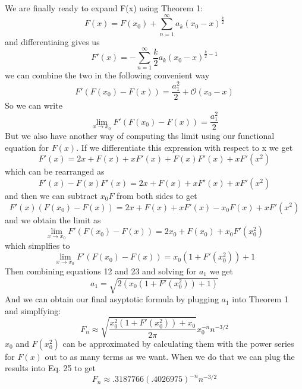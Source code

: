 \documentclass{article}
\begin{document}
We are finally ready to expand F(x) using Theorem 1:
\begin{equation}
F(x)=F(x_0)+\sum_{n=1}^\infty a_k(x_0-x)^{\frac{k}{2}}
\end{equation}
and differentiaing gives us
\begin{equation}
F'(x)=-\sum_{n=1}^\infty \frac{k}{2} a_k(x_0-x)^{\frac{k}{2}-1}
\end{equation}
we can combine the two in the following convenient way
\begin{equation}
F'(F(x_0)-F(x))=\frac{a_1^2}{2} + \mathscr{O}(x_0-x)
\end{equation}
So we can write
\[\lim_{x\to x_0}F'(F(x_0)-F(x))=\frac{a_1^2}{2}\]
 But we also have another way of computing ths limit using our functional equation for \(F(x)\). If we differentiate this expression with respect to x we get
\begin{equation}
F'(x)=2x+F(x)+xF'(x)+F(x)F'(x)+xF'(x^2)
\end{equation}
which can be rearranged as
\begin{equation}
F'(x)-F(x)F'(x)=2x+F(x)+xF'(x)+xF'(x^2)
\end{equation}
and then we can subtract \(x_0F\) from both sides to get
\[F'(x)(F(x_0)-F(x))=2x+F(x)+xF'(x)-x_0F(x)+xF'(x^2)\]
and we obtain the limit as
\[\lim_{x\to x_0}F'(F(x_0)-F(x))=2x_0+F(x_0)+x_0F'(x_0^2)\]
which simplfies to
\begin{equation}
\lim_{x\to x_0}F'(F(x_0)-F(x))=x_0(1+F'(x_0^2))+1
\end{equation}
Then combining equations 12 and 23 and solving for \(a_1\) we get
\begin{equation}
a_1=\sqrt{2(x_0(1+F'(x_0^2))+1)}
\end{equation}
And we can obtain our final asyptotic formula by plugging \(a_1\) into Theorem 1 and simplfying:
\begin{equation}
F_n \approx \sqrt{\frac{x_0^2(1+F'(x_0^2))+x_0}{2\pi}}x_0^{-n}n^{-3/2}
\end{equation}
\(x_0\) and \(F(x_0^2)\) can be approximated by calculating them with the power series for \(F(x)\) out to as many terms as we want. When we do that we can plug the results into Eq. 25 to get 
\begin{equation}
F_n \approx .3187766(.4026975)^{-n}n^{-3/2}
\end{equation}
\end{document}
